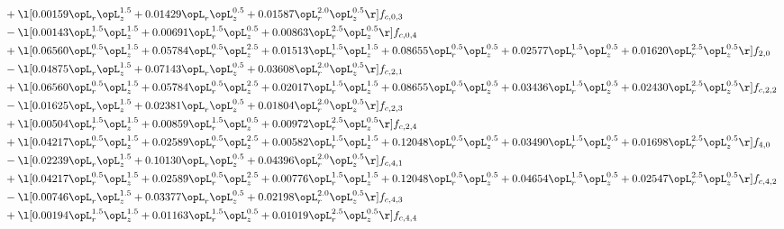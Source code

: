 \begin{alignat}{2}
& + \l[  0.00159 \opL_r \opL_z^{1.5} +  0.01429 \opL_r \opL_z^{0.5} +  0.01587 \opL_r^{2.0} \opL_z^{0.5}  \r] f_{c,0,3} \nonumber \\ 
& - \l[  0.00143 \opL_r^{1.5} \opL_z^{1.5} +  0.00691 \opL_r^{1.5} \opL_z^{0.5} +  0.00863 \opL_r^{2.5} \opL_z^{0.5}  \r] f_{c,0,4} \nonumber \\ 
& + \l[  0.06560 \opL_r^{0.5} \opL_z^{1.5} +  0.05784 \opL_r^{0.5} \opL_z^{2.5} +  0.01513 \opL_r^{1.5} \opL_z^{1.5} +  0.08655 \opL_r^{0.5} \opL_z^{0.5} +  0.02577 \opL_r^{1.5} \opL_z^{0.5} +  0.01620 \opL_r^{2.5} \opL_z^{0.5}  \r] f_{2,0} \nonumber \\ 
& - \l[  0.04875 \opL_r \opL_z^{1.5} +  0.07143 \opL_r \opL_z^{0.5} +  0.03608 \opL_r^{2.0} \opL_z^{0.5}  \r] f_{c,2,1} \nonumber \\ 
& + \l[  0.06560 \opL_r^{0.5} \opL_z^{1.5} +  0.05784 \opL_r^{0.5} \opL_z^{2.5} +  0.02017 \opL_r^{1.5} \opL_z^{1.5} +  0.08655 \opL_r^{0.5} \opL_z^{0.5} +  0.03436 \opL_r^{1.5} \opL_z^{0.5} +  0.02430 \opL_r^{2.5} \opL_z^{0.5}  \r] f_{c,2,2} \nonumber \\ 
& - \l[  0.01625 \opL_r \opL_z^{1.5} +  0.02381 \opL_r \opL_z^{0.5} +  0.01804 \opL_r^{2.0} \opL_z^{0.5}  \r] f_{c,2,3} \nonumber \\ 
& + \l[  0.00504 \opL_r^{1.5} \opL_z^{1.5} +  0.00859 \opL_r^{1.5} \opL_z^{0.5} +  0.00972 \opL_r^{2.5} \opL_z^{0.5}  \r] f_{c,2,4} \nonumber \\ 
& + \l[  0.04217 \opL_r^{0.5} \opL_z^{1.5} +  0.02589 \opL_r^{0.5} \opL_z^{2.5} +  0.00582 \opL_r^{1.5} \opL_z^{1.5} +  0.12048 \opL_r^{0.5} \opL_z^{0.5} +  0.03490 \opL_r^{1.5} \opL_z^{0.5} +  0.01698 \opL_r^{2.5} \opL_z^{0.5}  \r] f_{4,0} \nonumber \\ 
& - \l[  0.02239 \opL_r \opL_z^{1.5} +  0.10130 \opL_r \opL_z^{0.5} +  0.04396 \opL_r^{2.0} \opL_z^{0.5}  \r] f_{c,4,1} \nonumber \\ 
& + \l[  0.04217 \opL_r^{0.5} \opL_z^{1.5} +  0.02589 \opL_r^{0.5} \opL_z^{2.5} +  0.00776 \opL_r^{1.5} \opL_z^{1.5} +  0.12048 \opL_r^{0.5} \opL_z^{0.5} +  0.04654 \opL_r^{1.5} \opL_z^{0.5} +  0.02547 \opL_r^{2.5} \opL_z^{0.5}  \r] f_{c,4,2} \nonumber \\ 
& - \l[  0.00746 \opL_r \opL_z^{1.5} +  0.03377 \opL_r \opL_z^{0.5} +  0.02198 \opL_r^{2.0} \opL_z^{0.5}  \r] f_{c,4,3} \nonumber \\ 
& + \l[  0.00194 \opL_r^{1.5} \opL_z^{1.5} +  0.01163 \opL_r^{1.5} \opL_z^{0.5} +  0.01019 \opL_r^{2.5} \opL_z^{0.5}  \r] f_{c,4,4} \nonumber \\ 
\end{alignat} 


